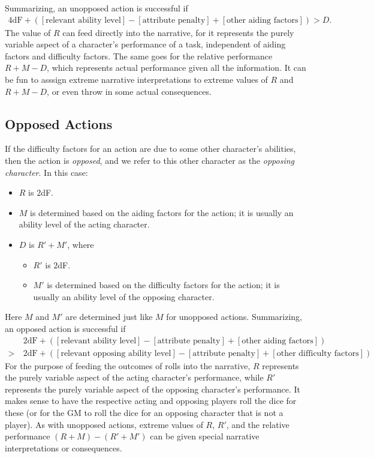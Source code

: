 \documentclass[12pt]{article}
\newcommand{\emdex}[1]{\emph{#1}\index{#1}}
\begin{document}
Summarizing, an unopposed action is successful if
\begin{align*}
4\text{dF}
+([\text{relevant ability level}]
-[\text{attribute penalty}]
+[\text{other aiding factors}])
> D.
\end{align*}
The value of $R$ can feed directly into the narrative,
for it represents the purely variable aspect of a character's performance of a task,
independent of aiding factors and difficulty factors.
The same goes for the relative performance $R+M-D$, which represents actual performance given all the information.
It can be fun to asssign extreme narrative interpretations to extreme values of $R$ and $R+M-D$,
or even throw in some actual consequences.


\subsection{Opposed Actions}\label{sec:opposed}
If the difficulty factors for an action are due to some other character's abilities,
then the action is \emph{opposed}, and we refer to this other character 
as the \emdex{opposing character}.
In this case:
\vspace{-1em}
\begin{itemize}
\item $R$ is $2$dF.
\item $M$ is determined based on the aiding factors for the action; it is usually an ability level of the acting character.
\item $D$ is $R' + M'$, where
\begin{itemize}
\item $R'$ is $2$dF.
\item $M'$ is determined based on the difficulty factors for the action; it is usually an ability level of the opposing character.
\end{itemize}
\end{itemize}
Here $M$ and $M'$ are determined just like $M$ for unopposed actions.
Summarizing, an opposed action is successful if
\begin{align*}
&2\text{dF}
+([\text{relevant ability level}]
-[\text{attribute penalty}]
+[\text{other aiding factors}])\\
>\ & 
2\text{dF}
+([\text{relevant opposing ability level}]
-[\text{attribute penalty}]
+[\text{other difficulty factors}]).
\end{align*}
For the purpose of feeding the outcomes of rolls into the narrative,
$R$ represents the purely variable aspect of the acting character's performance,
while $R'$ represents the purely variable aspect of the opposing character's performance.
It makes sense to have the respective acting and opposing players roll the dice for these (or for the GM to roll the dice for an opposing character that is not a player).
As with unopposed actions, extreme values of $R$, $R'$,
and the relative performance $(R+M)-(R'+M')$
can be given special narrative interpretations or consequences.
\end{document}
